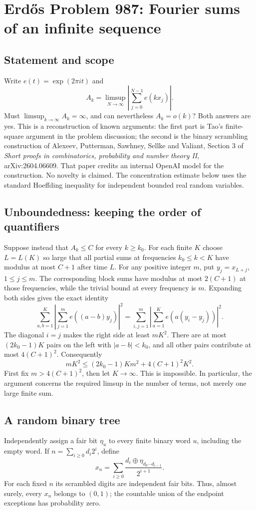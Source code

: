 \section*{Erd\H{o}s Problem 987: Fourier sums of an infinite sequence}
\subsection*{Statement and scope}
Write $e(t)=\exp(2\pi it)$ and
\[
 A_k=\limsup_{N\to\infty}\left|\sum_{j=0}^{N-1}e(kx_j)\right|.
\]
Must $\limsup_{k\to\infty}A_k=\infty$, and can nevertheless $A_k=o(k)$? Both answers are yes. This is a reconstruction of known arguments: the first part is Tao's finite-square argument in the problem discussion; the second is the binary scrambling construction of Alexeev, Putterman, Sawhney, Sellke and Valiant, Section 3 of \emph{Short proofs in combinatorics, probability and number theory II}, arXiv:2604.06609. That paper credits an internal OpenAI model for the construction. No novelty is claimed. The concentration estimate below uses the standard Hoeffding inequality for independent bounded real random variables.

\subsection*{Unboundedness: keeping the order of quantifiers}
Suppose instead that $A_k\le C$ for every $k\ge k_0$. For each finite $K$ choose $L=L(K)$ so large that all partial sums at frequencies $k_0\le k<K$ have modulus at most $C+1$ after time $L$. For any positive integer $m$, put $y_j=x_{L+j}$, $1\le j\le m$. The corresponding block sums have modulus at most $2(C+1)$ at those frequencies, while the trivial bound at every frequency is $m$. Expanding both sides gives the exact identity
\[
 \sum_{a,b=1}^{K}\left|\sum_{j=1}^{m}e((a-b)y_j)\right|^2
 =
 \sum_{i,j=1}^{m}\left|\sum_{a=1}^{K}e(a(y_i-y_j))\right|^2.
\]
The diagonal $i=j$ makes the right side at least $mK^2$. There are at most $(2k_0-1)K$ pairs on the left with $|a-b|<k_0$, and all other pairs contribute at most $4(C+1)^2$. Consequently
\[
 mK^2\le (2k_0-1)Km^2+4(C+1)^2K^2.
\]
First fix $m>4(C+1)^2$, then let $K\to\infty$. This is impossible. In particular, the argument concerns the required limsup in the number of terms, not merely one large finite sum.

\subsection*{A random binary tree}
Independently assign a fair bit $\eta_u$ to every finite binary word $u$, including the empty word. If $n=\sum_{i\ge0}d_i2^i$, define
\[
 x_n=\sum_{i\ge0}\frac{d_i\mathbin{\oplus}\eta_{d_0\cdots d_{i-1}}}{2^{i+1}}.
\]
For each fixed $n$ its scrambled digits are independent fair bits. Thus, almost surely, every $x_n$ belongs to $(0,1)$; the countable union of the endpoint exceptions has probability zero.

